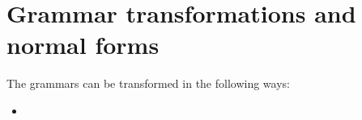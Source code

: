 \section{Grammar transformations and normal forms}

The grammars can be transformed in the following ways: 
\begin{itemize}
    \item 
\end{itemize}